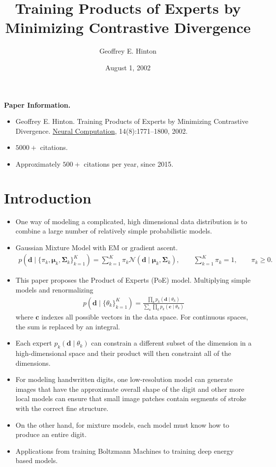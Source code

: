 \documentclass[10pt]{article}
\title{Training Products of Experts by Minimizing Contrastive Divergence}
\author{Geoffrey E. Hinton}
\date{August 1, 2002}
\newcommand{\NN}{\mathcal{N}}
\begin{document}
\textbf{Paper Information.}

\begin{itemize}
\item Geoffrey E. Hinton. Training Products of Experts by Minimizing Contrastive Divergence. \underline{Neural Computation}, 14(8):1771--1800, 2002.
\item $5000+$ citations.
\item Approximately $500+$ citations per year, since 2015.
\end{itemize}

\section{Introduction}

\begin{itemize}
\item One way of modeling a complicated, high dimensional data distribution is to combine a large number of relatively simple probabilistic models.
\item Gaussian Mixture Model with EM or gradient ascent.
\begin{align*}
p(\mathbf{d} \mid \{\pi_k, \bm{\mu}_k, \mathbf{\Sigma}_k\}_{k = 1}^K) = \sum_{k = 1}^K \pi_k \NN(\mathbf{d} \mid \bm{\mu}_k, \mathbf{\Sigma}_k), \qquad \sum_{k = 1}^K \pi_k = 1, \qquad \pi_k \geq 0.
\end{align*}
\item This paper proposes the Product of Experts (PoE) model. Multiplying simple models and renormalizing
\begin{align*}
p(\mathbf{d} \mid \{\theta_k\}_{k = 1}^K) = \frac{\prod_k p_k(\mathbf{d} \mid \theta_k)}{\sum_\mathbf{c} \prod_k p_k(\mathbf{c} \mid \theta_k)}
\end{align*}
where $\mathbf{c}$ indexes all possible vectors in the data space. For continuous spaces, the sum is replaced by an integral.
\item Each expert $p_k(\mathbf{d} \mid \theta_k)$ can constrain a different subset of the dimension in a high-dimensional space and their product will then constraint all of the dimensions.
\item For modeling handwritten digits, one low-resolution model can generate images that have the approximate overall shape of the digit and other more local models can ensure that small image patches contain segments of stroke with the correct fine structure.
\item On the other hand, for mixture models, each model must know how to produce an entire digit.
\item Applications from training Boltzmann Machines to training deep energy based models.
\end{itemize}
\end{document}
